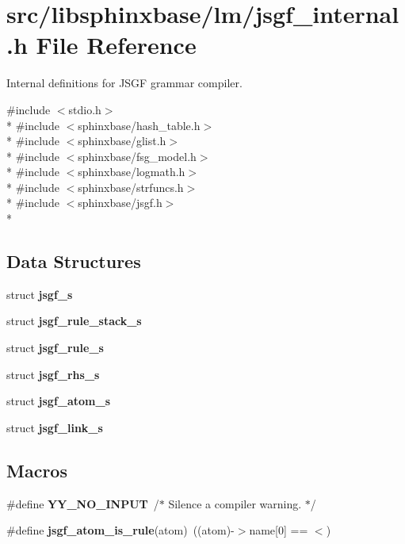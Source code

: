 \section{src/libsphinxbase/lm/jsgf\+\_\+internal.h File Reference}
\label{jsgf__internal_8h}


Internal definitions for J\+S\+G\+F grammar compiler.  


{\ttfamily \#include $<$stdio.\+h$>$}\\*
{\ttfamily \#include $<$sphinxbase/hash\+\_\+table.\+h$>$}\\*
{\ttfamily \#include $<$sphinxbase/glist.\+h$>$}\\*
{\ttfamily \#include $<$sphinxbase/fsg\+\_\+model.\+h$>$}\\*
{\ttfamily \#include $<$sphinxbase/logmath.\+h$>$}\\*
{\ttfamily \#include $<$sphinxbase/strfuncs.\+h$>$}\\*
{\ttfamily \#include $<$sphinxbase/jsgf.\+h$>$}\\*
\subsection*{Data Structures}
\begin{DoxyCompactItemize}
\item 
struct {\bf jsgf\+\_\+s}
\item 
struct {\bf jsgf\+\_\+rule\+\_\+stack\+\_\+s}
\item 
struct {\bf jsgf\+\_\+rule\+\_\+s}
\item 
struct {\bf jsgf\+\_\+rhs\+\_\+s}
\item 
struct {\bf jsgf\+\_\+atom\+\_\+s}
\item 
struct {\bf jsgf\+\_\+link\+\_\+s}
\end{DoxyCompactItemize}
\subsection*{Macros}
\begin{DoxyCompactItemize}
\item 
\#define {\bfseries Y\+Y\+\_\+\+N\+O\+\_\+\+I\+N\+P\+U\+T}~/$\ast$ Silence a compiler warning. $\ast$/\label{jsgf__internal_8h_a85523a0c7d95c059d251b4e9829947aa}

\item 
\#define {\bfseries jsgf\+\_\+atom\+\_\+is\+\_\+rule}(atom)~((atom)-\/$>$name[0] == \textquotesingle{}$<$\textquotesingle{})\label{jsgf__internal_8h_ac4452bbb59863e64d73f4fe2d6cd394f}

\end{DoxyCompactItemize}
